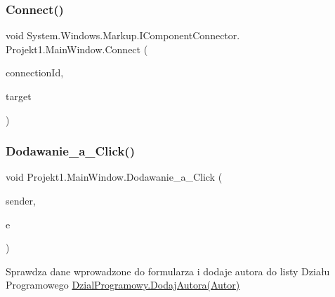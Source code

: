\mbox{\label{class_projekt1_1_1_main_window_ae7ef4e7422455818e8e3deda6cc75900}} 
\subsubsection{\texorpdfstring{Connect()}{Connect()}\hspace{0.1cm}{\footnotesize\ttfamily [3/3]}}
{\footnotesize\ttfamily void System.\+Windows.\+Markup.\+I\+Component\+Connector. Projekt1.\+Main\+Window.\+Connect (\begin{DoxyParamCaption}\item[{int}]{connection\+Id,  }\item[{object}]{target }\end{DoxyParamCaption})\hspace{0.3cm}{\ttfamily [private]}}

\mbox{\label{class_projekt1_1_1_main_window_a7c47edbac430842dfc7cb637863160b6}} 
\subsubsection{\texorpdfstring{Dodawanie\_a\_Click()}{Dodawanie\_a\_Click()}}
{\footnotesize\ttfamily void Projekt1.\+Main\+Window.\+Dodawanie\+\_\+a\+\_\+\+Click (\begin{DoxyParamCaption}\item[{object}]{sender,  }\item[{Routed\+Event\+Args}]{e }\end{DoxyParamCaption})\hspace{0.3cm}{\ttfamily [private]}}



Sprawdza dane wprowadzone do formularza i dodaje autora do listy Działu Programowego \mbox{\hyperlink{class_projekt1_1_1_dzial_programowy_ae3036a341f8a8ecc9c4069cc3604a8d3}{Dzial\+Programowy.\+Dodaj\+Autora(\+Autor)}} 

\mbox{\label{class_projekt1_1_1_main_window_a6e02390940f88787309592a970516240}} 
